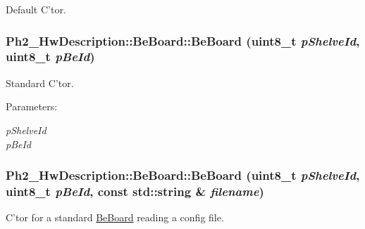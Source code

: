 Default C'tor. 

\hypertarget{class_ph2___hw_description_1_1_be_board_4aca8e709e5ae58d4d12ea544dff9a9e}{
\subsubsection[BeBoard]{\setlength{\rightskip}{0pt plus 5cm}Ph2\_\-Hw\-Description::Be\-Board::Be\-Board (uint8\_\-t {\em p\-Shelve\-Id}, uint8\_\-t {\em p\-Be\-Id})}}
\label{class_ph2___hw_description_1_1_be_board_4aca8e709e5ae58d4d12ea544dff9a9e}


Standard C'tor. 

\begin{Desc}
\item[Parameters:]
\begin{description}
\item[{\em p\-Shelve\-Id}]\item[{\em p\-Be\-Id}]\end{description}
\end{Desc}
\hypertarget{class_ph2___hw_description_1_1_be_board_53b49ebde44e6c052c64865b50f33764}{
\subsubsection[BeBoard]{\setlength{\rightskip}{0pt plus 5cm}Ph2\_\-Hw\-Description::Be\-Board::Be\-Board (uint8\_\-t {\em p\-Shelve\-Id}, uint8\_\-t {\em p\-Be\-Id}, const std::string \& {\em filename})}}
\label{class_ph2___hw_description_1_1_be_board_53b49ebde44e6c052c64865b50f33764}


C'tor for a standard \hyperlink{class_ph2___hw_description_1_1_be_board}{Be\-Board} reading a config file. 

